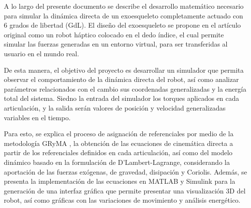 A lo largo del presente documento se describe el desarrollo matemático necesario para 
simular la dinámica directa de un exoesqueleto completamente actuado con 6 grados de 
libertad (GdL). El diseño del exoesqueleto se propone en el artículo original \cite{hexotrac} como un robot háptico 
colocado en el dedo índice, el cual permite simular las fuerzas generadas en un entorno virtual, 
para ser transferidas al usuario en el mundo real. 

De esta manera, el objetivo del proyecto es  desarrollar un simulador 
que permita observar el comportamiento de la dinámica directa del robot, así como analizar parámetros 
relacionados con el cambio sus coordenadas generalizadas y la energía total del sistema. Siedno la entrada del simulador los
torques aplicados en cada articulación, y la salida serán valores de posición y velocidad generalizadas variables en el tiempo.

Para esto, se explica el proceso de asignación de referenciales por medio de la metodología GRyMA \cite{rigid_multibody},
la obtención de las ecuaciones de cinemática directa a partir de los referenciales definidos en cada articulación, 
así como del modelo dinámico basado en la formulación de D'Lambert-Lagrange, considerando 
la aportación de las fuerzas exógenas, de gravedad, disipación y Coriolis. Además, se presenta la implementación de las 
ecuaciones en MATLAB y Simulink para la generación de una interfaz gráfica que permite presentar una visualización 
3D del robot, así como gráficas con las variaciones de movimiento y análisis energético.